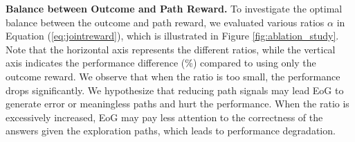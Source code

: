 

\textbf{Balance between Outcome and Path Reward.}
To investigate the optimal balance between the outcome and path reward, we evaluated various ratios $\alpha$ in Equation (\ref{eq:jointreward}), which is illustrated in Figure \ref{fig:ablation_study}.
Note that the horizontal axis represents the different ratios, while the vertical axis indicates the performance difference (\%) compared to using only the outcome reward.
We observe that when the ratio is too small, the performance drops significantly.
We hypothesize that reducing path signals may lead EoG to generate error or meaningless paths and hurt the performance.
When the ratio is excessively increased, EoG may pay less attention to the correctness of the answers given the exploration paths, which leads to performance degradation.



\begin{table}[ht]
\centering
\caption{Evaluation of the impact of the path reward.}
\label{tab:efficiency_path_reward}
\end{table}

